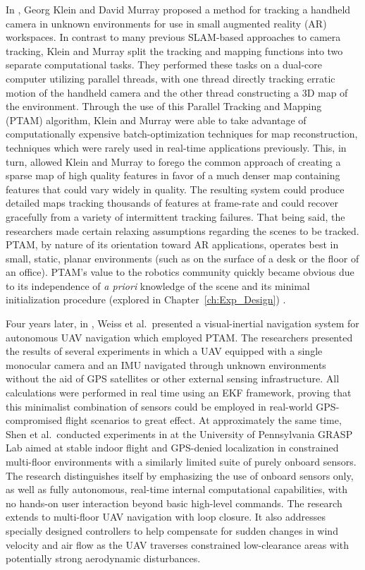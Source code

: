 In \cite{Klein2007}, Georg Klein and David Murray proposed a method for tracking a handheld camera in unknown environments for use in small augmented reality (AR) workspaces. In contrast to many previous SLAM-based approaches to camera tracking, Klein and Murray split the tracking and mapping functions into two separate computational tasks. They performed these tasks on a dual-core computer utilizing parallel threads, with one thread directly tracking erratic motion of the handheld camera and the other thread constructing a 3D map of the environment. Through the use of this Parallel Tracking and Mapping (PTAM) algorithm, Klein and Murray were able to take advantage of computationally expensive batch-optimization techniques for map reconstruction, techniques which were rarely used in real-time applications previously. This, in turn, allowed Klein and Murray to forego the common approach of creating a sparse map of high quality features in favor of a much denser map containing features that could vary widely in quality. The resulting system could produce detailed maps tracking thousands of features at frame-rate and could recover gracefully from a variety of intermittent tracking failures. That being said, the researchers made certain relaxing assumptions regarding the scenes to be tracked. PTAM, by nature of its orientation toward AR applications, operates best in small, static, planar environments (such as on the surface of a desk or the floor of an office). PTAM's value to the robotics community quickly became obvious due to its independence of \textit{a priori} knowledge of the scene and its minimal initialization procedure (explored in Chapter~\ref{ch:Exp_Design}) . 

Four years later, in \cite{Weiss2011}, Weiss et al.\ presented a visual-inertial navigation system for autonomous UAV navigation which employed PTAM. The researchers presented the results of several experiments in which a UAV equipped with a single monocular camera and an IMU navigated through unknown environments without the aid of GPS satellites or other external sensing infrastructure. All calculations were performed in real time using an EKF framework, proving that this minimalist combination of sensors could be employed in real-world GPS-compromised flight scenarios to great effect. At approximately the same time, Shen et al.\ conducted experiments in \cite{Shen2011} at the University of Pennsylvania GRASP Lab aimed at stable indoor flight and GPS-denied localization in constrained multi-floor environments with a similarly limited suite of purely onboard sensors. The research distinguishes itself by emphasizing the use of onboard sensors only, as well as fully autonomous, real-time internal computational capabilities, with no hands-on user interaction beyond basic high-level commands. The research extends to multi-floor UAV navigation with loop closure. It also addresses specially designed controllers to help compensate for sudden changes in wind velocity and air flow as the UAV traverses constrained low-clearance areas with potentially strong aerodynamic disturbances.

